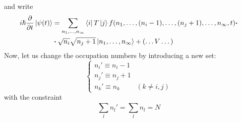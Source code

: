 \documentclass[../main/main.tex]{subfiles}
\begin{document}
and write
\begin{equation*}
\begin{split}
  i \hbar \pdv{}{t} \ket{ \psi (t)} &= \sum_{n_1, \dots, n_ \infty }^{} \bra{i} T \ket{j}  f (n_1, \dots, (n_i -1), \dots, (n_j+1), \dots, n_ \infty ,t) \vdot  \\& \vdot \sqrt{n_i}  \sqrt{n_j+1} \ket{n_1, \dots, n_ \infty } + ( \dots V \dots)
\end{split}
\end{equation*}
Now, let us change the occupation numbers by introducing a new set:  
\begin{equation*}
  \begin{cases}
   n_i' \equiv n_i -1 \\
   n_j' \equiv n_j +1 \\
   n_k' \equiv n_k & (k \neq i,j)
  \end{cases}
\end{equation*}
with the constraint
\begin{equation*}
  \sum_{l}^{} n_l' = \sum_{l}^{} n_l = N
\end{equation*}
\end{document}
